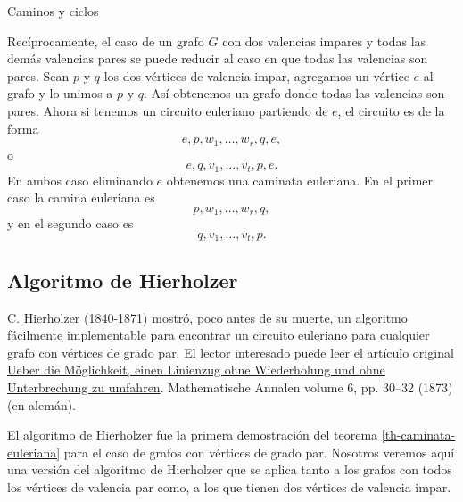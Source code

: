 \begin{section}{Caminos y ciclos}
\begin{observacion}\label{obs-impar-a-par}
    Recíprocamente,  el caso de un grafo  $G$ con dos valencias impares y todas las demás valencias pares  se puede reducir al caso en que todas las valencias son pares. Sean $p$ y $q$ los dos vértices de valencia impar,  agregamos un vértice $e$  al grafo y lo unimos a $p$ y $q$. Así obtenemos un grafo donde todas las valencias son pares. Ahora si tenemos  un circuito euleriano partiendo de $e$, el circuito es de la forma
    \begin{equation*}
        e, p,w_1,\ldots,w_r,q,e, 
    \end{equation*}
    o
    \begin{equation*}
        e, q,v_1,\ldots,v_t,p,e. 
    \end{equation*}
    En  ambos caso eliminando $e$ obtenemos una caminata euleriana. En el primer caso la camina euleriana es
    \begin{equation*}
        p,w_1,\ldots,w_r,q, 
    \end{equation*}
    y en el segundo caso es
    \begin{equation*}
        q,v_1,\ldots,v_t,p. 
    \end{equation*}

\end{observacion}

\subsection*{Algoritmo de Hierholzer}

C. Hierholzer (1840-1871) mostró, poco antes de su muerte, un algoritmo fácilmente implementable para encontrar un circuito euleriano  para cualquier grafo  con vértices de grado  par. El lector interesado puede leer el artículo original \href{https://eudml.org/doc/156599}{Ueber die Möglichkeit, einen Linienzug ohne Wiederholung und ohne Unterbrechung zu umfahren}. Mathematische Annalen volume 6, pp. 30–32 (1873) (en alemán). 

El algoritmo de Hierholzer fue la primera demostración del teorema \ref{th-caminata-euleriana} para el caso  de grafos con vértices de grado par. 
Nosotros veremos aquí una versión del algoritmo de Hierholzer que se aplica tanto a los grafos con todos los vértices de valencia par como, a los que tienen dos vértices de valencia impar. 


\end{section}

